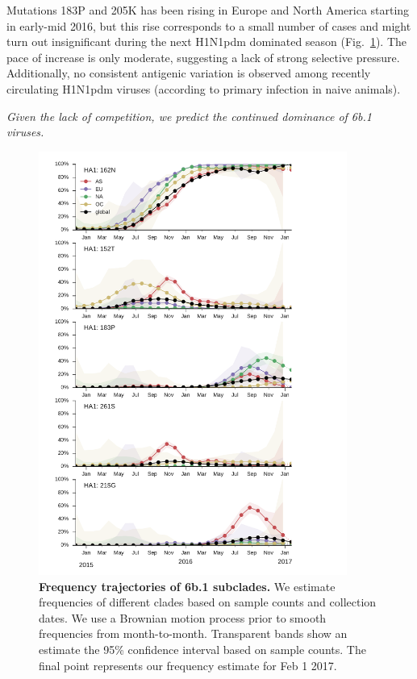 \documentclass[11pt,oneside,letterpaper]{article}
\begin{document}
Mutations 183P and 205K has been rising in Europe and North America starting in early-mid 2016, but this rise corresponds to a small number of cases and might turn out insignificant during the next H1N1pdm dominated season (Fig.\ \ref{H1N1pdm_mutations}). The pace of increase is only moderate, suggesting a lack of strong selective pressure. Additionally, no consistent antigenic variation is observed among recently circulating H1N1pdm viruses (according to primary infection in naive animals).

\textit{Given the lack of competition, we predict the continued dominance of 6b.1 viruses.}

\pagebreak

\begin{figure}[H]
	\centering
	\includegraphics[width=0.9\textwidth]{../figures/feb-2017/h1n1pdm_frequencies.pdf}
	\caption{\textbf{Frequency trajectories of 6b.1 subclades.}
	We estimate frequencies of different clades based on sample counts and collection dates.
	We use a Brownian motion process prior to smooth frequencies from month-to-month.
	Transparent bands show an estimate the 95\% confidence interval based on sample counts.
	The final point represents our frequency estimate for Feb 1 2017.
	}
	\label{H1N1pdm_mutations}
\end{figure}
\end{document}
